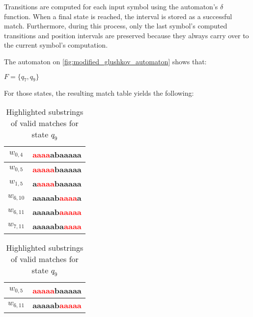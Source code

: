 Transitions are computed for each input symbol using the automaton's $\delta$ function. When a final state is reached, the interval is stored as a successful match. Furthermore, during this process, only the last symbol's computed transitions and position intervals are preserved because they always carry over to the current symbol's computation.

The automaton on \ref{fig:modified_glushkov_automaton} shows that:

\begin{center}
	$F = \{q_7, q_9\}$
\end{center}

For those states, the resulting match table yields the following:

\begin{table}[H]
	\centering
	\renewcommand{\arraystretch}{1.2}
	
	\begin{minipage}[t]{0.48\textwidth}
		\caption{Highlighted substrings of valid matches for state $q_7$}
		\centering
		\begin{tabular}{|c|>{\ttfamily}l|}
			\hline
			$w_{0,4}$  & \textbf{\textcolor{red}{aaaa}}\textbf{abaaaaa} \\ \hline
			$w_{0,5}$  & \textbf{\textcolor{red}{aaaaa}}\textbf{baaaaa} \\ \hline
			$w_{1,5}$  & \textbf{a}\textbf{\textcolor{red}{aaaa}}\textbf{baaaaa} \\ \hline
			$w_{6,10}$ & \textbf{aaaaab}\textbf{\textcolor{red}{aaaa}}\textbf{a} \\ \hline
			$w_{6,11}$ & \textbf{aaaaab}\textbf{\textcolor{red}{aaaaa}} \\ \hline
			$w_{7,11}$ & \textbf{aaaaaba}\textbf{\textcolor{red}{aaaa}} \\ \hline
		\end{tabular}
		\label{tab:left-highlights}
	\end{minipage}\hfill
		\begin{minipage}[t]{0.48\textwidth}
		\caption{Highlighted substrings of valid matches for state $q_9$}
		\centering
		\begin{tabular}{|c|>{\ttfamily}l|}
			\hline
			$w_{0,5}$  & \textbf{\textcolor{red}{aaaaa}}\textbf{baaaaa} \\ \hline
			$w_{6,11}$ & \textbf{aaaaab}\textbf{\textcolor{red}{aaaaa}} \\ \hline
		\end{tabular}
		\label{tab:left-highlights1}
	\end{minipage}
\end{table}

